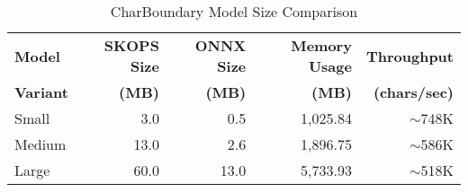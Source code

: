 \begin{table}[htbp!]
\centering
\caption{CharBoundary Model Size Comparison}
\label{tab:charboundary-model-size}
\begin{tabular}{lrrrr}
\toprule
\textbf{Model} & \textbf{SKOPS Size} & \textbf{ONNX Size} & \textbf{Memory Usage} & \textbf{Throughput} \\
\textbf{Variant} & \textbf{(MB)} & \textbf{(MB)} & \textbf{(MB)} & \textbf{(chars/sec)} \\
\midrule
Small & 3.0 & 0.5 & 1,025.84 & $\sim$748K \\
Medium & 13.0 & 2.6 & 1,896.75 & $\sim$586K \\
Large & 60.0 & 13.0 & 5,733.93 & $\sim$518K \\
\bottomrule
\end{tabular}
\end{table}